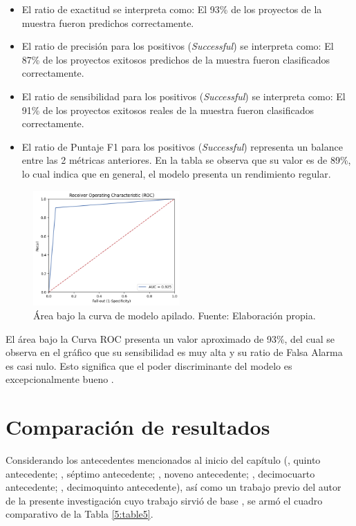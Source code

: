 \begin{itemize}
	\item El ratio de exactitud se interpreta como: El 93\% de los proyectos de la muestra fueron predichos correctamente.
	\item El ratio de precisión para los positivos (\textit{Successful}) se interpreta como: El 87\% de los proyectos exitosos predichos de la muestra fueron clasificados correctamente. 
	\item El ratio de sensibilidad para los positivos (\textit{Successful}) se interpreta como: El 91\% de los proyectos exitosos reales de la muestra fueron clasificados correctamente.
	\item El ratio de Puntaje F1 para los positivos (\textit{Successful}) representa un balance entre las 2 métricas anteriores. En la tabla se observa que su valor es de 89\%, lo cual indica que en general, el modelo presenta un rendimiento regular.
\end{itemize}

\begin{figure}[!ht]
	\begin{center}
		\includegraphics[width=0.50\textwidth]{5/figures/stacked_auc.png}
		\caption{Área bajo la curva de modelo apilado. Fuente: Elaboración propia.}
		\label{5:fig12}
	\end{center}
\end{figure}

El área bajo la Curva ROC presenta un valor aproximado de 93\%, del cual se observa en el gráfico que su sensibilidad es muy alta y su ratio de Falsa Alarma es casi nulo. Esto significa que el poder discriminante del modelo es excepcionalmente bueno \parencite{bk_britos2006datamining}.

\section{Comparación de resultados}
Considerando los antecedentes mencionados al inicio del capítulo (\cite{pr_beckwith2016predcrowd}, quinto antecedente; \cite{pr_yuan2016textanalytics}, séptimo antecedente; \cite{pr_kaur2017socmedcrowd}, noveno antecedente; \cite{pr_cheng2019deeplearning}, decimocuarto antecedente; \cite{pr_chen2019keywords_crowdfunding}, decimoquinto antecedente), así como un trabajo previo del autor de la presente investigación cuyo trabajo sirvió de base \parencite{pr_puente2019kickstarter_prediction}, se armó el cuadro comparativo de la Tabla \ref{5:table5}.

